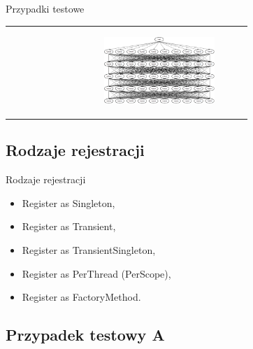 \documentclass{beamer}
\begin{document}
\begin{frame}{Przypadki testowe}
\begin{table}
\begin{small}
\begin{tabular}{ p{4cm} p{6cm} }
\begin{minipage}{.5\textwidth}
\begin{figure}[H]
\begin{center}
	\end{center}
\end{figure}
   	 \end{minipage}
   	 &	
	\begin{minipage}{.5\textwidth}
\begin{figure}[H]
	\begin{center}
  		\includegraphics[height=2.5cm]{TestD.png}
	\end{center}
\end{figure}
   	 \end{minipage}

	\end{tabular}
     \end{small}
\end{table}
\end{frame}

\subsection*{Rodzaje rejestracji}

\begin{frame}{Rodzaje rejestracji}
\begin{itemize}
	\item Register as Singleton,
	\item Register as Transient,
	\item Register as TransientSingleton,
	\item Register as PerThread (PerScope),
	\item Register as FactoryMethod.
\end{itemize}
\end{frame}

\subsection*{Przypadek testowy A}
\end{document}
